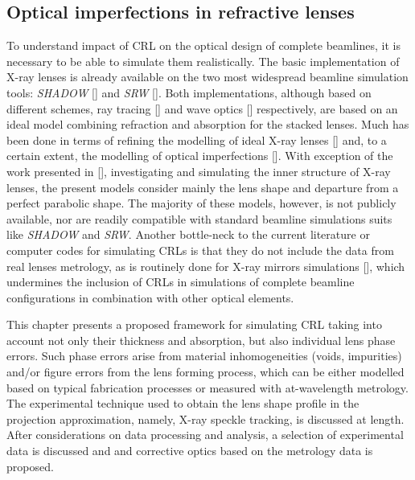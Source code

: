 \begin{refsection}
\chapter{Optical imperfections in refractive lenses}\label{sec:optical_imperfections}

To understand impact of CRL on the optical design of complete beamlines, it is necessary to be able to simulate them realistically. The basic implementation of X-ray lenses is already available on the two most widespread beamline simulation tools: \textit{SHADOW} [\cite{SanchezdelRio2011}] and \textit{SRW} [\cite{Chubar1998}]. Both implementations, although based on different schemes, ray tracing [\cite{Alianelli2007}] and wave optics [\cite{Baltser2011}] respectively, are based on an ideal model combining refraction and absorption for the stacked lenses. Much has been done in terms of refining the modelling of ideal X-ray lenses [\cite{Umbach2008, SanchezdelRio2012, Osterhoff2013, Simons2017, Pedersen2018}] and, to a certain extent, the modelling of optical imperfections [\cite{Pantell2001, Andrejczuk2010, Gasilov2017, Osterhoff2017}]. With exception of the work presented in [\cite{Roth2014}], investigating and simulating the inner structure of X-ray lenses, the present models consider mainly the lens shape and departure from a perfect parabolic shape. The majority of these models, however, is not publicly available, nor are readily compatible with standard beamline simulations suits like \textit{SHADOW} and \textit{SRW}. Another bottle-neck to the current literature or computer codes for simulating CRLs is that they do not include the data from real lenses metrology, as is routinely done for X-ray mirrors simulations [\cite{SanchezDelRio2016}], which undermines the inclusion of CRLs in simulations of complete beamline configurations in combination with other optical elements.

This chapter presents a proposed framework for simulating CRL taking into account not only their thickness and absorption, but also individual lens phase errors. Such phase errors arise from material inhomogeneities (voids, impurities) and/or figure errors from the lens forming process, which can be either modelled based on typical fabrication processes or measured with at-wavelength metrology. The experimental technique used to obtain the lens shape profile in the projection approximation, namely, X-ray speckle tracking, is discussed at length. After considerations on data processing and analysis, a selection of experimental data is discussed and and corrective optics based on the metrology data is proposed. 


\end{refsection}
